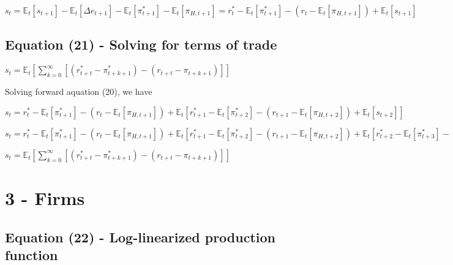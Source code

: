 \documentclass[
]{article}
\begin{document}
\(s_t = \mathbb{E}_t[s_{t+1}]-\mathbb{E}_t[\Delta e_{t+1}] -\mathbb{E}_t[\pi_{t+1}^*]-\mathbb{E}_t[\pi_{H,t+1}]=r_t^*-\mathbb{E}_t[\pi_{t+1}^*] - (r_t-\mathbb{E}_t[\pi_{H,t+1}])+\mathbb{E}_t[s_{t+1}]\)

\vspace{12pt}

\hypertarget{equation-21---solving-for-terms-of-trade}{%
\subsection{Equation (21) - Solving for terms of
trade}\label{equation-21---solving-for-terms-of-trade}}

\(\displaystyle s_t = \mathbb{E}_t \left[ \sum_{k=0}^\infty [\left( r_{t+t}^*-\pi_{t+k+1}^*\right)-\left( r_{t+t}-\pi_{t+k+1}\right)] \right]\)

\vspace{8pt}

Solving forward aquation (20), we have

\(s_t =r_t^*-\mathbb{E}_t[\pi_{t+1}^*] - (r_t-\mathbb{E}_t[\pi_{H,t+1}])+\mathbb{E}_t[r_{t+1}^*-\mathbb{E}_t[\pi_{t+2}^*] - (r_{t+1}-\mathbb{E}_t[\pi_{H,t+2}])+\mathbb{E}_t[s_{t+2}]]\)

\(s_t =r_t^*-\mathbb{E}_t[\pi_{t+1}^*] - (r_t-\mathbb{E}_t[\pi_{H,t+1}])+\mathbb{E}_t[r_{t+1}^*-\mathbb{E}_t[\pi_{t+2}^*] - (r_{t+1}-\mathbb{E}_t[\pi_{H,t+2}])+\mathbb{E}_t[{r_{t+2}^*-\mathbb{E}_t[\pi_{t+3}^*] - (r_{t+2}-\mathbb{E}_t[\pi_{H,t+3}])+\mathbb{E}_t[s_{t+3}]}]]\)

\(\displaystyle s_t = \mathbb{E}_t \left[ \sum_{k=0}^\infty [\left( r_{t+t}^*-\pi_{t+k+1}^*\right)-\left( r_{t+t}-\pi_{t+k+1}\right)] \right]\)

\vspace{12pt}

\hypertarget{firms}{%
\section{3 - Firms}\label{firms}}

\vspace{12pt}

\hypertarget{equation-22---log-linearized-production-function}{%
\subsection{Equation (22) - Log-linearized production
function}\label{equation-22---log-linearized-production-function}}
\end{document}
